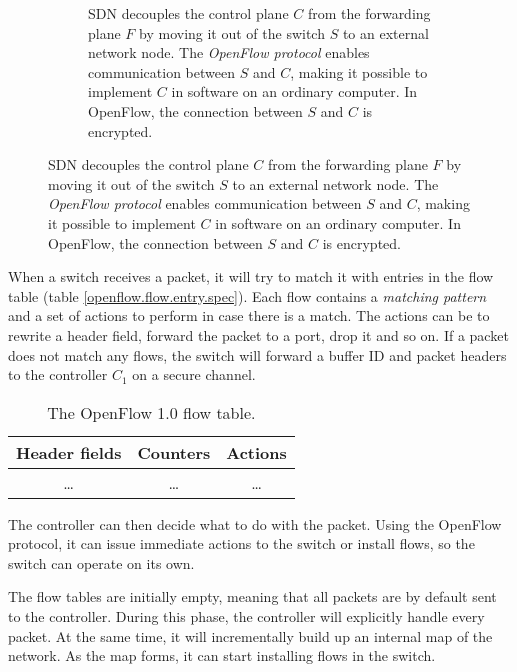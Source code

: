 \begin{figure}
\begin{subfigure}[t]{0.45\textwidth}
    \caption{\ac{SDN} decouples the control plane $C$ from the forwarding
      plane $F$ by moving it out of the switch $S$ to an external network
        node.  The \textit{OpenFlow protocol} enables communication between
        $S$ and $C$, making it possible to implement $C$ in software on an
        ordinary computer. In OpenFlow, the connection between $S$ and $C$ is encrypted.}
    \label{figure:decoupling.planes}
  \end{subfigure}
\end{figure}

When a switch receives a packet, it will try to match it with entries in
the flow table (table \vref{openflow.flow.entry.spec}).
%
Each flow contains a \textit{matching pattern} and
a set of actions to perform in
case there is a match.
%
The actions can be to rewrite a header field, forward the
packet to a port, drop it and so on.
%
If a packet does not match any flows, the switch will forward a buffer ID
and packet headers to the controller $C_1$ on a secure channel.

\begin{table}[H]
  \centering
  \begin{tabular}{|c|c|c|}
    \hline \textbf{Header fields} &
           \textbf{Counters} &
           \textbf{Actions} \\
    \hline \dots & \dots & \dots \\
  \end{tabular}

  \caption{The OpenFlow 1.0 flow table.}
  \label{openflow.flow.entry.spec}
\end{table}

The controller can then decide what to do with the packet.  Using the
OpenFlow protocol, it can issue immediate actions to the switch or install
flows, so the switch can operate on its own.

The flow tables are initially empty, meaning that all packets are by default
sent to the controller.  During this phase, the controller will
explicitly handle every packet.  At the same time, it will incrementally
build up an internal map of the network.  As the map forms, it can start
installing flows in the switch.

